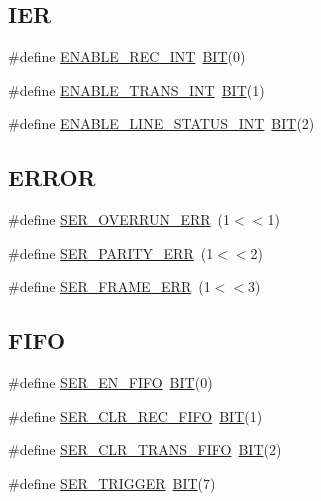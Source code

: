 \subsection*{I\+ER}
\begin{DoxyCompactItemize}
\item 
\#define \hyperlink{group__ser__port_gafe8e1c08ba9763a976c8359d6f5b370b}{E\+N\+A\+B\+L\+E\+\_\+\+R\+E\+C\+\_\+\+I\+NT}~\hyperlink{video__gr_8c_a3a8ea58898cb58fc96013383d39f482c}{B\+IT}(0)
\item 
\#define \hyperlink{group__ser__port_gac33182192c6023fe0d50c63666551162}{E\+N\+A\+B\+L\+E\+\_\+\+T\+R\+A\+N\+S\+\_\+\+I\+NT}~\hyperlink{video__gr_8c_a3a8ea58898cb58fc96013383d39f482c}{B\+IT}(1)
\item 
\#define \hyperlink{group__ser__port_ga89361f04d2aef788b076d1ea455d5482}{E\+N\+A\+B\+L\+E\+\_\+\+L\+I\+N\+E\+\_\+\+S\+T\+A\+T\+U\+S\+\_\+\+I\+NT}~\hyperlink{video__gr_8c_a3a8ea58898cb58fc96013383d39f482c}{B\+IT}(2)
\end{DoxyCompactItemize}
\subsection*{E\+R\+R\+OR}
\begin{DoxyCompactItemize}
\item 
\#define \hyperlink{group__ser__port_gac22f7e8109686500cf878a26ea3af115}{S\+E\+R\+\_\+\+O\+V\+E\+R\+R\+U\+N\+\_\+\+E\+RR}~(1$<$$<$1)
\item 
\#define \hyperlink{group__ser__port_ga356ae2e9093b65d87b35a303f3092057}{S\+E\+R\+\_\+\+P\+A\+R\+I\+T\+Y\+\_\+\+E\+RR}~(1$<$$<$2)
\item 
\#define \hyperlink{group__ser__port_ga0182fcdfbfeb90906d60c3ddb411aece}{S\+E\+R\+\_\+\+F\+R\+A\+M\+E\+\_\+\+E\+RR}~(1$<$$<$3)
\end{DoxyCompactItemize}
\subsection*{F\+I\+FO}
\begin{DoxyCompactItemize}
\item 
\#define \hyperlink{group__ser__port_ga096773e56aa66b4b8721492e07c41c77}{S\+E\+R\+\_\+\+E\+N\+\_\+\+F\+I\+FO}~\hyperlink{video__gr_8c_a3a8ea58898cb58fc96013383d39f482c}{B\+IT}(0)
\item 
\#define \hyperlink{group__ser__port_ga3b73c7fc2c9e1534d663a7b8c588240a}{S\+E\+R\+\_\+\+C\+L\+R\+\_\+\+R\+E\+C\+\_\+\+F\+I\+FO}~\hyperlink{video__gr_8c_a3a8ea58898cb58fc96013383d39f482c}{B\+IT}(1)
\item 
\#define \hyperlink{group__ser__port_ga565f202296c0e98389a04cf981110b2a}{S\+E\+R\+\_\+\+C\+L\+R\+\_\+\+T\+R\+A\+N\+S\+\_\+\+F\+I\+FO}~\hyperlink{video__gr_8c_a3a8ea58898cb58fc96013383d39f482c}{B\+IT}(2)
\item 
\#define \hyperlink{group__ser__port_ga4c5703803ba2f88b2c80a98503cd7b48}{S\+E\+R\+\_\+\+T\+R\+I\+G\+G\+ER}~\hyperlink{video__gr_8c_a3a8ea58898cb58fc96013383d39f482c}{B\+IT}(7)
\end{DoxyCompactItemize}
